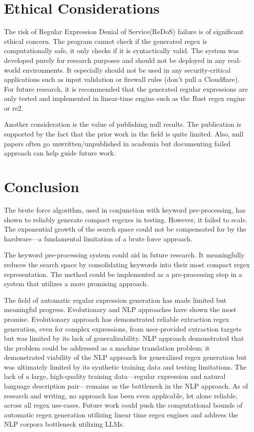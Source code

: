 \documentclass[10pt,twocolumn]{article}
\begin{document}
\section{Ethical Considerations}

The risk of Regular Expression Denial of Service(ReDoS) failure is of significant ethical concern. The program cannot check if the generated regex is computationally safe, it only checks if it is syntactically valid. The system was developed purely for research purposes and should not be deployed in any real-world environments. It especially should not be used in any security-critical applications such as input validation or firewall rules (don't pull a Cloudflare). For future research, it is recommended that the generated regular expressions are only tested and implemented in linear-time engine such as the Rust regex engine or re2.

Another consideration is the value of publishing null results. The publication is supported by the fact that the prior work in the field is quite limited. Also, null papers often go unwritten/unpublished in academia but documenting failed approach can help guide future work.

\section{Conclusion}
The brute force algorithm, used in conjunction with keyword pre-processing, has shown to reliably generate compact regexes in testing. However, it failed to scale. The exponential growth of the search space could not be compensated for by the hardware—a fundamental limitation of a brute force approach.

The keyword pre-processing system could aid in future research. It meaningfully reduces the search space by consolidating keywords into their most compact regex representation. The method could be implemented as a pre-processing step in a system that utilizes a more promising approach.

The field of automatic regular expression generation has made limited but meaningful progress. Evolutionary and NLP approaches have shown the most promise. Evolutionary approach has demonstrated reliable extraction regex generation, even for complex expressions, from user-provided extraction targets but was limited by its lack of generalizability. NLP approach demonstrated that the problem could be addressed as a machine translation problem; it demonstrated viability of the NLP approach for generalized regex generation but was ultimately limited by its synthetic training data and testing limitations. The lack of a large, high-quality training data—regular expression and natural language description pair—remains as the bottleneck in the NLP approach. As of research and writing, no approach has been even applicable, let alone reliable, across all regex use-cases. Future work could push the computational bounds of automatic regex generation utilizing linear time regex engines and address the NLP corpora bottleneck utilizing LLMs. 
\end{document}
